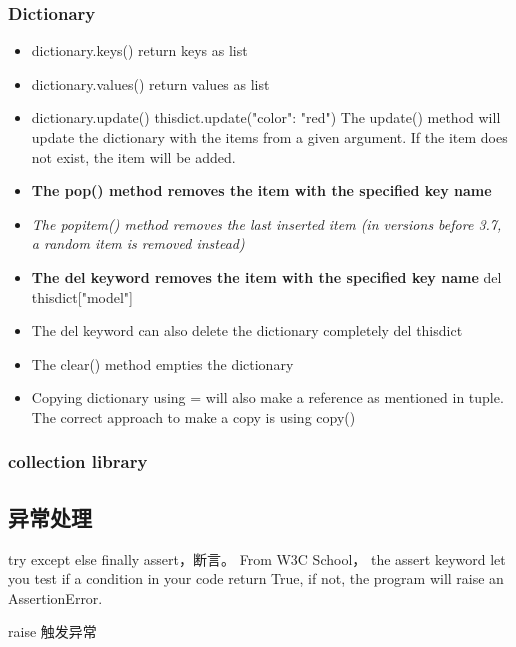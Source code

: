 \documentclass[UTF8]{article}
\begin{document}
\subsubsection{Dictionary}
\begin{itemize}
    \item dictionary.keys() return keys as list

    \item dictionary.values() return values as list
    \item dictionary.update()  thisdict.update({"color": "red"}) The update() method will update the dictionary with the items from a given argument. If the item does not exist, the item will be added.
    \item \textbf{The pop() method removes the item with the specified key name}
    \item \textit{The popitem() method removes the last inserted item (in versions before 3.7, a random item is removed instead)}
    \item \textbf{The del keyword removes the item with the specified key name} \newline del thisdict["model"]

    \item The del keyword can also delete the dictionary completely \newline del thisdict
    \item The clear() method empties the dictionary
    \item Copying dictionary using = will also make a reference as mentioned in tuple. The correct approach to make a copy is using copy() 
\end{itemize}


\subsubsection{collection library}

\subsection{异常处理}

try except else finally \newline
assert，断言。 From W3C School， the assert keyword let you test if a condition in your code return  True, if not, the program will raise an AssertionError.\newline

raise 触发异常
\end{document}
